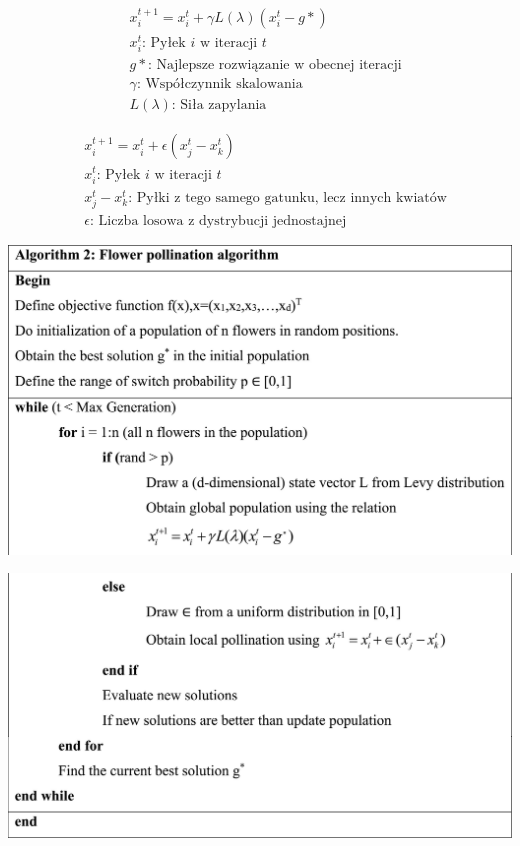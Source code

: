 \documentclass[aspectratio=169,15pt,]{beamer}
\begin{document}
\begin{frame}
	\centering
	\begin{align*}
	&x_i^{t+1}=x_i^t +\gamma L (\lambda )(x_i^t - g* ) \\
	&x_i^t  \text{: Pyłek } i \text{ w iteracji } t\\
	&g* \text{: Najlepsze rozwiązanie w obecnej iteracji}\\
	& \gamma \text{: Współczynnik skalowania}\\
	&L(\lambda) \text{: Siła zapylania}
	\end{align*}


\end{frame}

\begin{frame}
	\centering
	\begin{align*}
	&x_i^{t+1}=x_i^t +\epsilon ( x_j^t - x_k^t)\\
	&x_i^t  \text{: Pyłek } i \text{ w iteracji } t\\
	& x_j^t - x_k^t \text{: Pyłki z tego samego gatunku, lecz innych kwiatów}\\
	& \epsilon \text{: Liczba losowa z dystrybucji jednostajnej}
	\end{align*}


\end{frame}

\begin{frame}
\includegraphics[width =\textwidth,height=\textheight]{Obrazy/Pseudo2.jpg}
\end{frame}
\begin{frame}
\includegraphics[width =\textwidth,height=\textheight]{Obrazy/Pseudo3.jpg}
\end{frame}
\end{document}
